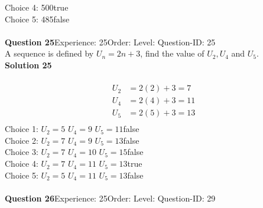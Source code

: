 \documentclass{article}
\begin{document}
Choice 4: \hspace{20pt}500\hspace{20pt}true\\
Choice 5: \hspace{20pt}485\hspace{20pt}false\\
\\[4pt]
\noindent\textbf{Question 25}\hspace{20pt}Experience: 25\hspace{20pt}Order: \hspace{20pt}Level: \hspace{20pt}Question-ID: 25\\[2pt]
A sequence is defined by $U_n=2n+3$, find the value of $U_2, U_4$ and $U_5$.\\[4pt]
\noindent\textbf{Solution 25}\\[2pt]
\\[-35pt]\begin{align*}
U_2&=2(2)+3=7\\[2pt]
U_4&=2(4)+3=11\\[2pt]
U_5&=2(5)+3=13\\[2pt]
\end{align*}
Choice 1: \hspace{20pt}$U_2=5 \,\, U_4=9 \,\, U_5=11$\hspace{20pt}false\\
Choice 2: \hspace{20pt}$U_2=7 \,\, U_4=9 \,\, U_5=13$\hspace{20pt}false\\
Choice 3: \hspace{20pt}$U_2=7 \,\, U_4=10 \,\, U_5=15$\hspace{20pt}false\\
Choice 4: \hspace{20pt}$U_2=7 \,\, U_4=11 \,\, U_5=13$\hspace{20pt}true\\
Choice 5: \hspace{20pt}$U_2=5 \,\, U_4=11 \,\, U_5=13$\hspace{20pt}false\\
\\[4pt]
\noindent\textbf{Question 26}\hspace{20pt}Experience: 25\hspace{20pt}Order: \hspace{20pt}Level: \hspace{20pt}Question-ID: 29\\[2pt]
\end{document}
